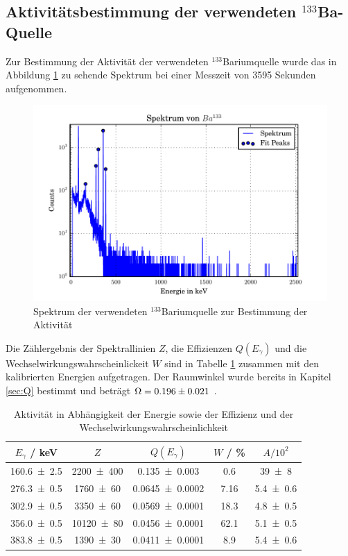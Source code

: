 \subsection{Aktivitätsbestimmung der verwendeten $^{133}$Ba-Quelle}
Zur Bestimmung der Aktivität der verwendeten $^{133}$Bariumquelle wurde das in Abbildung \ref{fig:BA} zu sehende Spektrum bei einer Messzeit von 3595 Sekunden aufgenommen.
\begin{figure}[H]
  \centering
  \includegraphics[width=\textwidth]{./build/SpektBa.pdf}
  \caption{Spektrum der verwendeten $^{133}$Bariumquelle zur Bestimmung der Aktivität}
  \label{fig:BA}
\end{figure}
Die Zählergebnis der Spektrallinien $Z$, die Effizienzen $Q(E_\gamma)$ und die Wechselwirkungswahrscheinlickeit $W$ sind in Tabelle \ref{tab:Ba} zusammen mit den kalibrierten Energien aufgetragen. Der Raumwinkel wurde bereits in Kapitel \ref{sec:Q} bestimmt und beträgt $\Omega = \num{0.196 +- 0.021}$ .
\begin{table}[H]
  \centering
  \caption{Aktivität in Abhängigkeit der Energie sowie der Effizienz und der Wechselwirkungswahrscheinlichkeit}
  \begin{tabular}{c c c c c}
    \toprule
	$E_\gamma$ / keV & $Z$ & $Q(E_\gamma)$ & $W$ / \%  & $A / 10^2$\\
    \hline
    \num{160.6 +- 2.5}	& \num{2200 +- 400}	& \num{0.135 +- 0.003} 		& 0.6	& \num{39 +- 8}	\\
    \num{276.3 +- 0.5}  & \num{1760 +- 60}	& \num{0.0645 +- 0.0002} 	& 7.16 	& \num{5.4 +- 0.6}	\\
    \num{302.9 +- 0.5}	& \num{3350 +- 60} 	& \num{0.0569 +- 0.0001} 	& 18.3	& \num{4.8 +- 0.5} 	\\
    \num{356.0 +- 0.5}	& \num{10120 +-	80}	& \num{0.0456 +- 0.0001} 	& 62.1	& \num{5.1 +-	0.5}	\\
    \num{383.8 +- 0.5}	& \num{1390 +- 30}	& \num{0.0411 +- 0.0001} 	& 8.9	& \num{5.4 +- 0.6}	\\
    \bottomrule
  \end{tabular}
  \label{tab:Ba}
\end{table}

